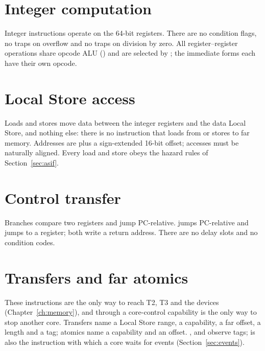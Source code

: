 
\chapter{Integer computation}\label{ch:i-int}
Integer instructions operate on the 64-bit registers. There are no condition flags, no traps on
overflow and no traps on division by zero. All register--register operations share opcode ALU
() and are selected by ; the immediate forms each have their own opcode.



\chapter{Local Store access}\label{ch:i-ls}
Loads and stores move data between the integer registers and the data Local Store, and nothing else:
there is no instruction that loads from or stores to far memory. Addresses are  plus a
sign-extended 16-bit offset; accesses must be naturally aligned. Every load and store obeys the hazard
rules of Section~\ref{sec:asif}.



\chapter{Control transfer}\label{ch:i-ctl}
Branches compare two registers and jump PC-relative.  jumps PC-relative and 
jumps to a register; both write a return address. There are no delay slots and no condition codes.



\chapter{Transfers and far atomics}\label{ch:i-xfer}
These instructions are the only way to reach T2, T3 and the devices (Chapter~\ref{ch:memory}), and
 through a core-control capability is the only way to stop another core. Transfers name a
Local Store range, a capability, a far offset, a length and a tag; atomics name a capability and an
offset. ,  and  observe tags;  is also the instruction
with which a core waits for events (Section~\ref{sec:events}).



